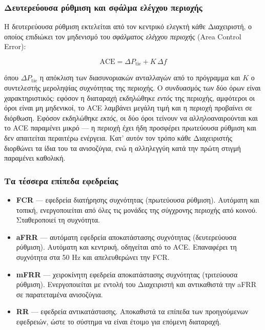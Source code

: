 \subsubsection*{Δευτερεύουσα ρύθμιση και σφάλμα ελέγχου περιοχής}

Η δευτερεύουσα ρύθμιση εκτελείται από τον κεντρικό ελεγκτή κάθε Διαχειριστή, ο οποίος
επιδιώκει τον μηδενισμό του \emph{σφάλματος ελέγχου περιοχής} (Area Control Error):

\begin{equation}
\mathrm{ACE} = \Delta P_{\mathrm{tie}} + K \, \Delta f
\label{eq:ace}
\end{equation}

όπου $\Delta P_{\mathrm{tie}}$ η απόκλιση των διασυνοριακών ανταλλαγών από το πρόγραμμα και
$K$ ο συντελεστής μεροληψίας συχνότητας της περιοχής. Ο συνδυασμός των δύο όρων είναι
χαρακτηριστικός: εφόσον η διαταραχή εκδηλώθηκε \emph{εντός} της περιοχής, αμφότεροι οι όροι
είναι μη μηδενικοί, το ACE λαμβάνει μεγάλη τιμή και η περιοχή προβαίνει σε διόρθωση.
Εφόσον εκδηλώθηκε \emph{εκτός}, οι δύο όροι τείνουν να αλληλοαναιρούνται και το ACE
παραμένει μικρό — η περιοχή έχει ήδη προσφέρει πρωτεύουσα ρύθμιση και δεν απαιτείται
περαιτέρω ενέργεια. Κατ' αυτόν τον τρόπο κάθε Διαχειριστής διορθώνει τα ίδια του τα
ανισοζύγια, ενώ η αλληλεγγύη κατά την πρώτη στιγμή παραμένει καθολική.

\subsubsection*{Τα τέσσερα επίπεδα εφεδρείας}

\begin{itemize}
\item \textbf{FCR} --- εφεδρεία διατήρησης συχνότητας (πρωτεύουσα ρύθμιση). Αυτόματη και
      τοπική, ενεργοποιείται από όλες τις μονάδες της σύγχρονης περιοχής από κοινού.
      Σταθεροποιεί τη συχνότητα.
\item \textbf{aFRR} --- αυτόματη εφεδρεία αποκατάστασης συχνότητας (δευτερεύουσα ρύθμιση).
      Αυτόματη και κεντρική, οδηγείται από το ACE. Επαναφέρει τη συχνότητα στα 50 Hz και
      απελευθερώνει την FCR.
\item \textbf{mFRR} --- χειροκίνητη εφεδρεία αποκατάστασης συχνότητας (τριτεύουσα ρύθμιση).
      Ενεργοποιείται με εντολή του Διαχειριστή και αντικαθιστά την aFRR σε παρατεταμένα
      ανισοζύγια.
\item \textbf{RR} --- εφεδρεία αντικατάστασης. Αποκαθιστά τα επίπεδα των προηγούμενων
      εφεδρειών, ώστε το σύστημα να είναι έτοιμο για επόμενη διαταραχή.
\end{itemize}

